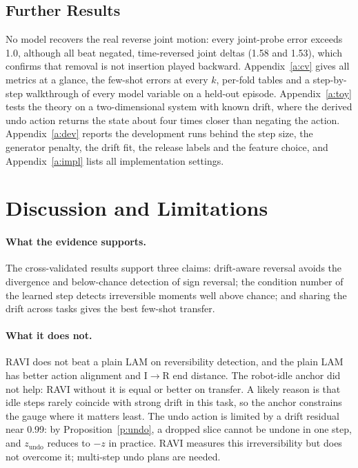 \documentclass{jcse}
\newcommand{\method}{RAVI}
\newcommand{\zundo}{z_{\mathrm{undo}}}
\begin{document}
\subsection{Further Results}
No model recovers the real reverse joint motion: every joint-probe error exceeds 1.0, although all beat negated, time-reversed joint deltas (1.58 and 1.53), which confirms that removal is not insertion played backward.
Appendix~\ref{a:cv} gives all metrics at a glance, the few-shot errors at every $k$, per-fold tables and a step-by-step walkthrough of every model variable on a held-out episode.
Appendix~\ref{a:toy} tests the theory on a two-dimensional system with known drift, where the derived undo action returns the state about four times closer than negating the action.
Appendix~\ref{a:dev} reports the development runs behind the step size, the generator penalty, the drift fit, the release labels and the feature choice, and Appendix~\ref{a:impl} lists all implementation settings.


\section{Discussion and Limitations} \label{s:discussion}

\paragraph{What the evidence supports.}
The cross-validated results support three claims: drift-aware reversal avoids the divergence and below-chance detection of sign reversal; the condition number of the learned step detects irreversible moments well above chance; and sharing the drift across tasks gives the best few-shot transfer.

\paragraph{What it does not.}
{\method} does not beat a plain LAM on reversibility detection, and the plain LAM has better action alignment and I$\to$R end distance.
The robot-idle anchor did not help: {\method} without it is equal or better on transfer.
A likely reason is that idle steps rarely coincide with strong drift in this task, so the anchor constrains the gauge where it matters least.
The undo action is limited by a drift residual near 0.99: by Proposition~\ref{p:undo}, a dropped slice cannot be undone in one step, and $\zundo$ reduces to $-z$ in practice.
{\method} measures this irreversibility but does not overcome it; multi-step undo plans are needed.
\end{document}
